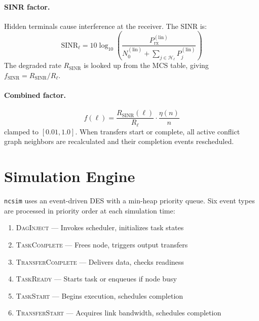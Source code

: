 \documentclass[conference]{IEEEtran}
\newcommand{\ncsim}{\texttt{ncsim}}
\begin{document}
\paragraph{SINR factor.}
Hidden terminals cause interference at the receiver.  The SINR is:
\begin{equation}
\text{SINR}_\ell = 10\log_{10}\!\left(\frac{P_\text{rx}^{(\text{lin})}}{N_0^{(\text{lin})} + \sum_{j \in \mathcal{H}_\ell} P_j^{(\text{lin})}}\right)
\label{eq:sinr}
\end{equation}
The degraded rate $R_\text{SINR}$ is looked up from the MCS table, giving
$f_\text{SINR} = R_\text{SINR}/R_\ell$.

\paragraph{Combined factor.}
\begin{equation}
\boxed{f(\ell) = \frac{R_\text{SINR}(\ell)}{R_\ell} \cdot \frac{\eta(n)}{n}}
\label{eq:combined}
\end{equation}
clamped to $[0.01, 1.0]$.  When transfers start or complete, all active
conflict graph neighbors are recalculated and their completion events
rescheduled.

\section{Simulation Engine}
\label{sec:engine}

\ncsim{} uses an event-driven DES with a min-heap priority queue.  Six event
types are processed in priority order at each simulation time:

\begin{enumerate}[itemsep=1pt,leftmargin=*]
\item \textsc{DagInject} --- Invokes scheduler, initializes task states
\item \textsc{TaskComplete} --- Frees node, triggers output transfers
\item \textsc{TransferComplete} --- Delivers data, checks readiness
\item \textsc{TaskReady} --- Starts task or enqueues if node busy
\item \textsc{TaskStart} --- Begins execution, schedules completion
\item \textsc{TransferStart} --- Acquires link bandwidth, schedules completion
\end{enumerate}
\end{document}
